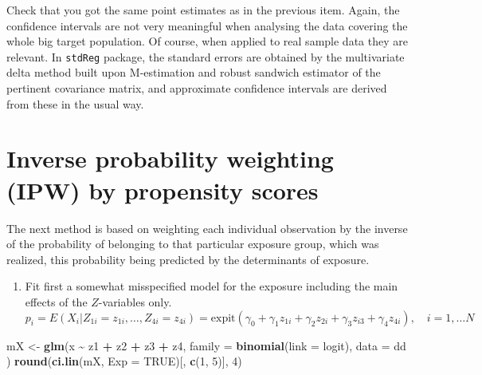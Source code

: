 \documentclass[
]{book}
\newenvironment{Shaded}{\begin{snugshade}}{\end{snugshade}}
\newcommand{\AttributeTok}[1]{\textcolor[rgb]{0.13,0.29,0.53}{#1}}
\newcommand{\ConstantTok}[1]{\textcolor[rgb]{0.56,0.35,0.01}{#1}}
\newcommand{\DecValTok}[1]{\textcolor[rgb]{0.00,0.00,0.81}{#1}}
\newcommand{\FunctionTok}[1]{\textcolor[rgb]{0.13,0.29,0.53}{\textbf{#1}}}
\newcommand{\NormalTok}[1]{#1}
\newcommand{\OtherTok}[1]{\textcolor[rgb]{0.56,0.35,0.01}{#1}}
\newcommand{\SpecialCharTok}[1]{\textcolor[rgb]{0.81,0.36,0.00}{\textbf{#1}}}
\providecommand{\tightlist}{%
  \setlength{\itemsep}{0pt}\setlength{\parskip}{0pt}}
\begin{document}
Check that you got the same point estimates as
in the previous item.
Again, the confidence intervals are not very
meaningful when analysing
the data covering the whole big target population.
Of course, when
applied to real sample data they are relevant.
In \texttt{stdReg} package, the
standard errors are obtained by the multivariate
delta method built upon
M-estimation and robust sandwich estimator of the
pertinent covariance
matrix, and approximate confidence intervals are derived
from these in the usual way.

\section{Inverse probability weighting (IPW) by propensity scores}\label{inverse-probability-weighting-ipw-by-propensity-scores}

The next method is based on weighting each individual
observation by the
inverse of the probability of belonging to that
particular exposure group, which was realized,
this probability being predicted by the
determinants of exposure.

\begin{enumerate}
\def\labelenumi{\arabic{enumi}.}
\tightlist
\item
  Fit first a somewhat misspecified
  model for the exposure including the main effects of the
  \(Z\)-variables only.
  \[ 
  p_i = E(X_i| Z_{1i} = z_{1i}, \dots, Z_{4i} = z_{4i})
  = \text{expit}(\gamma_0 + \gamma_1 z_{1i} + \gamma_2 z_{2i} +
     \gamma_3 z_{i3} + \gamma_4 z_{4i} ), \quad i=1, \dots N 
  \]
\end{enumerate}

\begin{Shaded}
\begin{Highlighting}[]
\NormalTok{mX }\OtherTok{\textless{}{-}} \FunctionTok{glm}\NormalTok{(x }\SpecialCharTok{\textasciitilde{}}\NormalTok{ z1 }\SpecialCharTok{+}\NormalTok{ z2 }\SpecialCharTok{+}\NormalTok{ z3 }\SpecialCharTok{+}\NormalTok{ z4,}
  \AttributeTok{family =} \FunctionTok{binomial}\NormalTok{(}\AttributeTok{link =}\NormalTok{ logit), }\AttributeTok{data =}\NormalTok{ dd}
\NormalTok{)}
\FunctionTok{round}\NormalTok{(}\FunctionTok{ci.lin}\NormalTok{(mX, }\AttributeTok{Exp =} \ConstantTok{TRUE}\NormalTok{)[, }\FunctionTok{c}\NormalTok{(}\DecValTok{1}\NormalTok{, }\DecValTok{5}\NormalTok{)], }\DecValTok{4}\NormalTok{)}
\end{Highlighting}
\end{Shaded}
\end{document}
